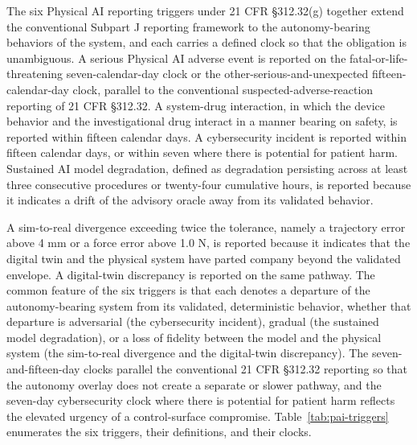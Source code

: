 The six Physical AI reporting triggers under 21 CFR \S 312.32(g) together extend the
conventional Subpart J reporting framework to the autonomy-bearing behaviors of the
system, and each carries a defined clock so that the obligation is unambiguous. A
serious Physical AI adverse event is reported on the fatal-or-life-threatening
seven-calendar-day clock or the other-serious-and-unexpected fifteen-calendar-day
clock, parallel to the conventional suspected-adverse-reaction reporting of 21 CFR
\S 312.32. A system-drug interaction, in which the device behavior and the
investigational drug interact in a manner bearing on safety, is reported within
fifteen calendar days. A cybersecurity incident is reported within fifteen calendar
days, or within seven where there is potential for patient harm. Sustained AI model
degradation, defined as degradation persisting across at least three consecutive
procedures or twenty-four cumulative hours, is reported because it indicates a drift
of the advisory oracle away from its validated behavior. 

A sim-to-real divergence
exceeding twice the tolerance, namely a trajectory error above 4 mm or a force error
above 1.0 N, is reported because it indicates that the digital twin and the physical
system have parted company beyond the validated envelope. A digital-twin discrepancy
is reported on the same pathway. The common feature of the six triggers is that each
denotes a departure of the autonomy-bearing system from its validated, deterministic
behavior, whether that departure is adversarial (the cybersecurity incident), gradual
(the sustained model degradation), or a loss of fidelity between the model and the
physical system (the sim-to-real divergence and the digital-twin discrepancy). The
seven-and-fifteen-day clocks parallel the conventional 21 CFR \S 312.32 reporting so
that the autonomy overlay does not create a separate or slower pathway, and the
seven-day cybersecurity clock where there is potential for patient harm reflects the
elevated urgency of a control-surface compromise. Table~\ref{tab:pai-triggers}
enumerates the six triggers, their definitions, and their clocks.

